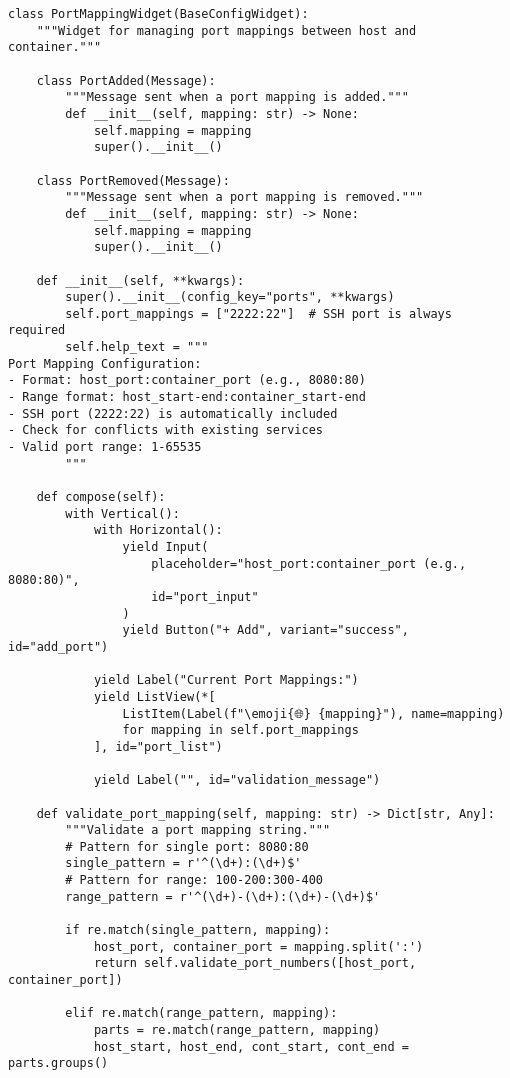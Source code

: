 \documentclass[11pt,a4paper]{article}
\newcommand{\emoji}[1]{{\emojifont #1}}
\begin{document}
\begin{lstlisting}[caption={ValidatedInput Implementation}]
class PortMappingWidget(BaseConfigWidget):
    """Widget for managing port mappings between host and container."""
    
    class PortAdded(Message):
        """Message sent when a port mapping is added."""
        def __init__(self, mapping: str) -> None:
            self.mapping = mapping
            super().__init__()
            
    class PortRemoved(Message):
        """Message sent when a port mapping is removed."""
        def __init__(self, mapping: str) -> None:
            self.mapping = mapping
            super().__init__()
    
    def __init__(self, **kwargs):
        super().__init__(config_key="ports", **kwargs)
        self.port_mappings = ["2222:22"]  # SSH port is always required
        self.help_text = """
Port Mapping Configuration:
- Format: host_port:container_port (e.g., 8080:80)
- Range format: host_start-end:container_start-end
- SSH port (2222:22) is automatically included
- Check for conflicts with existing services
- Valid port range: 1-65535
        """
        
    def compose(self):
        with Vertical():
            with Horizontal():
                yield Input(
                    placeholder="host_port:container_port (e.g., 8080:80)",
                    id="port_input"
                )
                yield Button("+ Add", variant="success", id="add_port")
                
            yield Label("Current Port Mappings:")
            yield ListView(*[
                ListItem(Label(f"\emoji{🌐} {mapping}"), name=mapping)
                for mapping in self.port_mappings
            ], id="port_list")
            
            yield Label("", id="validation_message")
            
    def validate_port_mapping(self, mapping: str) -> Dict[str, Any]:
        """Validate a port mapping string."""
        # Pattern for single port: 8080:80
        single_pattern = r'^(\d+):(\d+)$'
        # Pattern for range: 100-200:300-400  
        range_pattern = r'^(\d+)-(\d+):(\d+)-(\d+)$'
        
        if re.match(single_pattern, mapping):
            host_port, container_port = mapping.split(':')
            return self.validate_port_numbers([host_port, container_port])
            
        elif re.match(range_pattern, mapping):
            parts = re.match(range_pattern, mapping)
            host_start, host_end, cont_start, cont_end = parts.groups()
            

\end{lstlisting}
\end{document}

